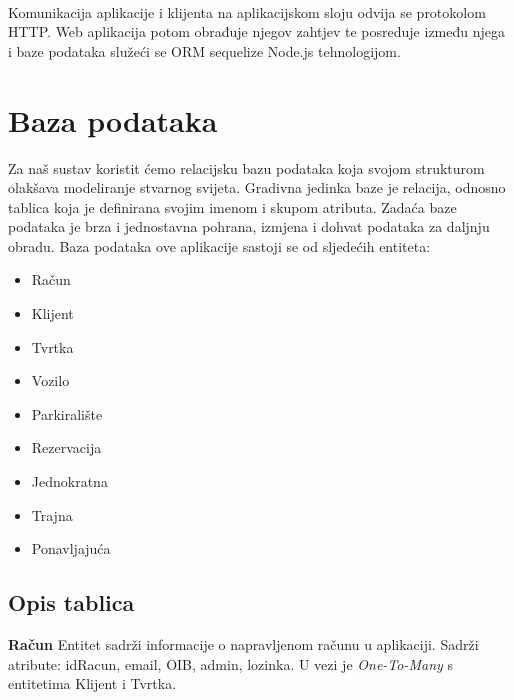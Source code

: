 		\paragraph{}
		
		Komunikacija aplikacije i klijenta na aplikacijskom sloju odvija se protokolom HTTP. Web aplikacija potom obrađuje njegov zahtjev te posreduje između njega i baze podataka služeći se ORM sequelize Node.js tehnologijom.

	
		

		

		\pagebreak		
		\section{Baza podataka}
			
		Za naš sustav koristit ćemo relacijsku bazu podataka koja svojom strukturom olakšava modeliranje stvarnog svijeta. Gradivna jedinka baze je relacija, odnosno tablica koja je definirana svojim imenom i skupom atributa. Zadaća baze podataka je brza i jednostavna pohrana, izmjena i dohvat podataka za daljnju obradu.
		\newline
        Baza podataka ove aplikacije sastoji se od sljedećih entiteta: 
        \begin{itemize}
            \item Račun
            \item Klijent
            \item Tvrtka
            \item Vozilo
            \item Parkiralište
            \item Rezervacija
            \item Jednokratna
            \item Trajna
            \item Ponavljajuća
        \end{itemize}
        
		
			\subsection{Opis tablica}
			
			    \textbf{Račun} \newline
			    Entitet sadrži informacije o napravljenom računu u aplikaciji. Sadrži
			    atribute: idRacun, email, OIB, admin, lozinka. U vezi je \textit{One-To-Many} s entitetima Klijent i Tvrtka.
				
